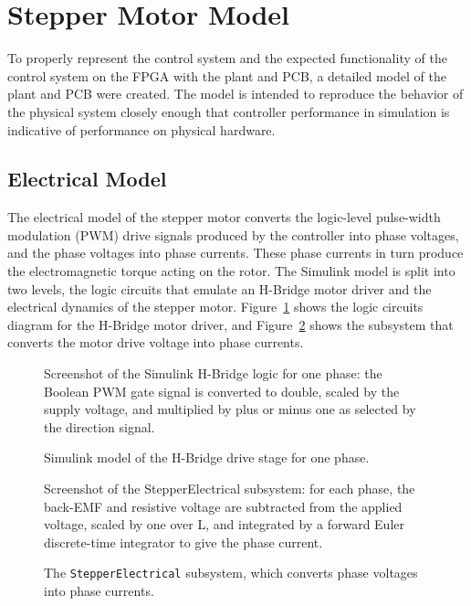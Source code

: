 \section{Stepper Motor Model}\label{sec:stepperMotorModel}

To properly represent the control system and the expected functionality of the control system on the FPGA with the plant and PCB, a detailed model of the plant and PCB were created. The model is intended to reproduce the behavior of the physical system closely enough that controller performance in simulation is indicative of performance on physical hardware.

\subsection{Electrical Model}\label{stepperMotorElectricalModel}
The electrical model of the stepper motor converts the logic-level pulse-width modulation (PWM) drive signals produced by the controller into phase voltages, and the phase voltages into phase currents. These phase currents in turn produce the electromagnetic torque acting on the rotor. The Simulink model is split into two levels, the logic circuits that emulate an H-Bridge motor driver and the electrical dynamics of the stepper motor. Figure~\ref{fig:hbridge_logic} %
shows the logic circuits diagram for the H-Bridge motor driver, and Figure~\ref{fig:stepper_electrical} %
shows the subsystem that converts the motor drive voltage into phase currents. 
\begin{figure}[htbp]
	\centering
		{Screenshot of the Simulink H-Bridge logic for one phase: the Boolean PWM gate signal is converted to double, scaled by the supply voltage, and multiplied by plus or minus one as selected by the direction signal.}
	\caption[Simulink model of the H-Bridge drive stage]{Simulink model of the H-Bridge drive stage for one phase.}
	\label{fig:hbridge_logic}
\end{figure}
\begin{figure}[htbp]
	\centering
		{Screenshot of the StepperElectrical subsystem: for each phase, the back-EMF and resistive voltage are subtracted from the applied voltage, scaled by one over L, and integrated by a forward Euler discrete-time integrator to give the phase current.}
	\caption[The StepperElectrical subsystem]{The \texttt{StepperElectrical} subsystem, which converts phase voltages into phase currents.}
	\label{fig:stepper_electrical}
\end{figure}
